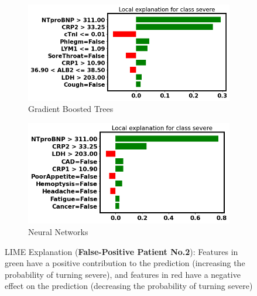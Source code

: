 \begin{figure}[H] \ContinuedFloat
\begin{subfigure}[b]{\textwidth}
    \centering
    \includegraphics[width=\textwidth]{figures/chapter_interp/lime_xgbc_2.png}
    \caption{Gradient Boosted Trees}
    \label{fig:lime_xgb_2}
\end{subfigure}
\begin{subfigure}[b]{\textwidth}
    \centering
    \includegraphics[width=\textwidth]{figures/chapter_interp/lime_nn_2.png}
    \caption{Neural Networks}
    \label{fig:lime_nn_2}
\end{subfigure}
\caption{LIME Explanation (\textbf{False-Positive Patient No.2}): Features in green have a positive contribution to the prediction (increasing the probability of turning severe), and features in red have a negative effect on the prediction (decreasing the probability of turning severe)}
\label{fig:lime_2}
\end{figure}

\vfill

\clearpage

